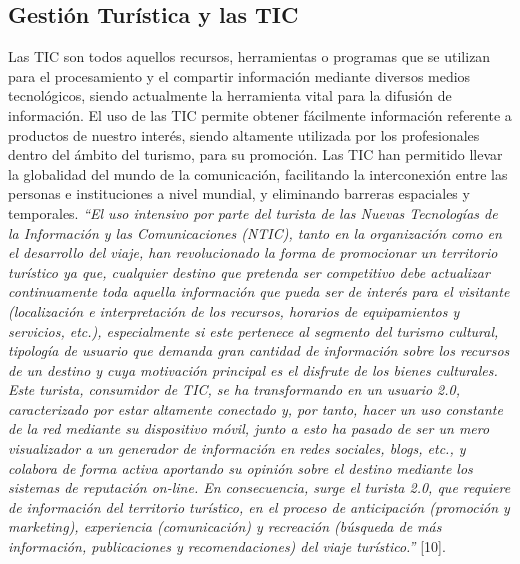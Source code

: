 \documentclass[12pt,letterpaper,openany]{book}
\begin{document}
\subsection{Gestión Turística y las TIC}
Las TIC son todos aquellos recursos, herramientas o programas que se utilizan para el procesamiento y el compartir información mediante diversos medios tecnológicos, siendo actualmente la herramienta vital para la difusión de información.
El uso de las TIC permite obtener fácilmente información referente a productos de nuestro interés, siendo altamente utilizada por los profesionales dentro del ámbito del turismo, para su promoción.
\vspace{5mm}\newline
Las TIC han permitido llevar la globalidad del mundo de la comunicación, facilitando la interconexión entre las personas e instituciones a nivel mundial, y eliminando barreras espaciales y temporales. 
\vspace{5mm}\newline
\textit{“El uso intensivo por parte del turista de las Nuevas Tecnologías de la Información y las Comunicaciones (NTIC), tanto en la organización como en el desarrollo del viaje, han revolucionado la forma de promocionar un territorio turístico ya que, cualquier destino que pretenda ser competitivo debe actualizar continuamente toda aquella información que pueda ser de interés para el visitante (localización e interpretación de los recursos, horarios de equipamientos y servicios, etc.), especialmente si este pertenece al segmento del turismo cultural, tipología de usuario que demanda gran cantidad de información sobre los recursos de un destino y cuya motivación principal es el disfrute de los bienes culturales.
Este turista, consumidor de TIC, se ha transformando en un usuario 2.0, caracterizado por estar altamente conectado y, por tanto, hacer un uso constante de la red mediante su dispositivo móvil, junto a esto ha pasado de ser un mero visualizador a un generador de información en redes sociales, blogs, etc., y colabora de forma activa aportando su opinión sobre el destino mediante los sistemas de reputación on-line. En consecuencia, surge el turista 2.0, que requiere de información del territorio turístico, en el proceso de anticipación (promoción y marketing), experiencia (comunicación) y recreación (búsqueda de más información, publicaciones y recomendaciones) del viaje turístico.”} [10].
\end{document}
